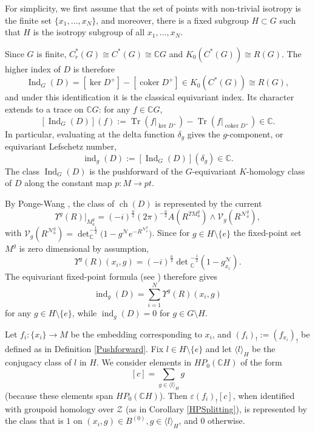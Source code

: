 \documentclass[a4paper]{amsart}
\newcommand{\Ind}{\operatorname{Ind}}
\newcommand{\ch}{\operatorname{ch}}
\newcommand{\CC}{\mathbb C}
\newcommand{\ind}{\operatorname{ind}}
\newcommand{\maZ}{\mathcal Z}
\newcommand\<{\langle}
\renewcommand\>{\rangle}
\theoremstyle{definition}
\theoremstyle{remark}
\begin{document}
For simplicity, we first assume that the set of points with non-trivial isotropy is the finite set
$\{x_1, \ldots, x_N\}$, and moreover,
there is a fixed subgroup $H \subset G$ such that $H$ is the isotropy subgroup of all $x_1, \ldots, x_N$.

Since $G$ is finite, $C^*_r(G) \cong C^*(G) \cong \mathbb{C}G$ and
$K _0(C^*(G)) \cong R(G)$.
The higher index of $D$ is therefore
$$\Ind_G(D)=[\ker D ^+]-[\operatorname{coker}D ^+]
\in K _0(C^*(G)) \cong R(G),$$
and under this identification it is the classical equivariant index.
Its character extends to a trace on $\mathbb{C}G$: for any $f \in \mathbb{C}G$,
$$[\Ind_G(D)](f) := \operatorname{Tr}(f|_{\ker D ^+})
- \operatorname{Tr}(f|_{\operatorname{coker}D ^+}) \in \mathbb{C}.$$
In particular, evaluating at the delta function $\delta_g$ gives the $g$-component,
or equivariant Lefschetz number,
$$\ind _g(D):=[\Ind_G(D)](\delta_g) \in \mathbb{C}.$$
The class $\Ind_G(D)$ is the pushforward of the $G$-equivariant $K$-homology class
of $D$ along the constant map $p: M \to pt$.

By Ponge-Wang \cite[Theorem 11.4]{PW18}, the class of $\ch (D)$ is represented by the current
\begin{equation}
\label{PWCh}
\Upsilon^g (R)\vert_{M_a^g}
= (-i)^{\frac{n}{2}}(2\pi)^{-\frac{a}{2}} \widehat{A}(R^{TM_a^g}) \wedge \mathcal{V}_g(R^{\mathcal{N}_a^g}),
\end{equation}
with $\mathcal{V}_g(R^{\mathcal{N}_a^g}) = \det_\CC ^{-\frac{1}{2}}\big(1 - g^{\mathcal{N}} e^{-R^{\mathcal{N}_a^g}} \big)$.
Since for $g \in H \setminus \{e\}$ the fixed-point set $M^g$ is zero dimensional by assumption,
\begin{equation}
\label{PWIsolated}
\Upsilon^g(R)(x_i,g)
=(-i)^{\frac{n}{2}}\det {}_\CC^{-\frac{1}{2}}(1-g^{\mathcal N}_{x_i}).
\end{equation}
The equivariant fixed-point formula (see \cite[Lemma 6.4]{BGVBook04}) therefore gives
\begin{equation}
\label{AB}
\ind_g(D)=\sum_{i=1}^N \Upsilon^g(R)(x_i,g)
\end{equation}
for any $g \in H \setminus \{e\}$, while $\ind_g(D)=0$ for $g \in G \setminus H$.

Let $f_i : \{ x_i \} \to M$ be the embedding corresponding to $x_i$,
and $(f_i)_! := (f _{x_i})_!$ be defined as in Definition \ref{Pushforward}.
Fix $l \in H \setminus \{e\}$ and let $\langle l \rangle _H $ be the conjugacy class of $l$ in $H$.
We consider elements in $H P _0 (\CC H)$ of the form
$$ [c] = \sum _{g \in \langle l \rangle _H } g $$
(because these elements span $H P _0 (\CC H)$).
Then $\varepsilon (f _i)_! [c] $, when identified with groupoid homology over $\maZ$ (as in Corollary \ref{HPSplitting}),
is represented by the class that is $1$ on $ (x_i , g) \in B ^{(0)}, g \in \langle l \rangle _H $, and $0$ otherwise.
\end{document}
